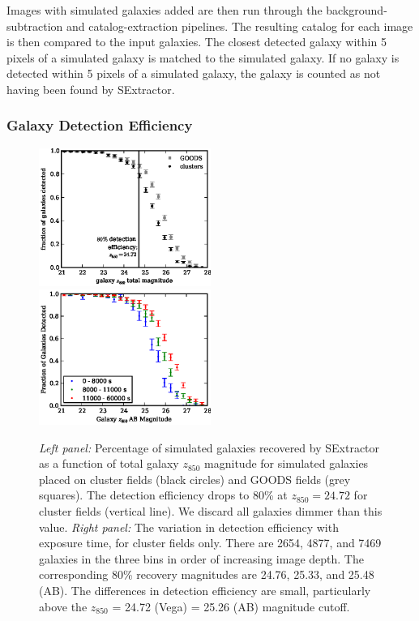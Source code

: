 Images with simulated galaxies added are then run through the
background-subtraction and catalog-extraction pipelines. The resulting
catalog for each image is then compared to the input galaxies. The
closest detected galaxy within 5 pixels of a simulated galaxy is
matched to the simulated galaxy. If no galaxy is detected within 5
pixels of a simulated galaxy, the galaxy is counted as not having been
found by {\sc SExtractor}. 

\subsubsection{Galaxy Detection Efficiency}

\begin{figure}[tp]
\includegraphics[width=0.5\textwidth]{figures/clrate/fakegals_eff.eps}
\includegraphics[width=0.5\textwidth]{figures/clrate/fakegals_eff_exptime.eps}
\caption[Simulated galaxy detection efficiency]{{\it Left panel:} Percentage of simulated 
galaxies recovered by {\sc SExtractor} as a function of total galaxy
  $z_{850}$ magnitude for simulated galaxies placed on cluster fields
  (black circles) and GOODS fields (grey squares). The
  detection efficiency drops to 80\% at $z_{850} = 24.72$ for cluster
  fields (vertical line). We discard all galaxies dimmer than
  this value.  {\it Right panel:} The variation in detection
  efficiency with exposure time, for cluster fields only.  There are
  2654, 4877, and 7469 galaxies in the three bins in order of
  increasing image depth. The corresponding 80\% recovery magnitudes
  are 24.76, 25.33, and 25.48 (AB). The differences in detection
  efficiency are small, particularly above the $z_{850}$ = 24.72 (Vega) =
  25.26 (AB) magnitude cutoff.
\label{fig:fakegals_eff}}
\end{figure}


